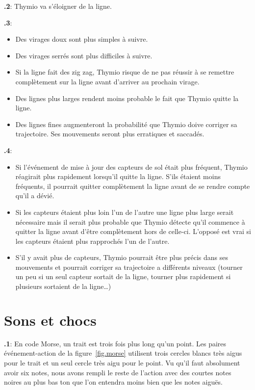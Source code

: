 \documentclass[12pt,a4paper,english]{article}
\begin{document}
\textbf{\thesection.2}: Thymio va s'éloigner de la ligne.

\textbf{\thesection.3}:
\begin{itemize}
\item Des virages doux sont plus simples à suivre. 
\item Des virages serrés sont plus difficiles à suivre.
\item Si la ligne fait des zig zag, Thymio risque de ne pas réussir à se remettre complètement sur la ligne avant d'arriver au prochain virage.
\item Des lignes plus larges rendent moins probable le fait que Thymio quitte la ligne.
\item Des lignes fines augmenteront la probabilité que Thymio doive corriger sa trajectoire. Ses mouvements seront plus erratiques et saccadés.
\end{itemize}


\textbf{\thesection.4}:
\begin{itemize}
\item Si l'événement de mise à jour des capteurs de sol était plus fréquent, Thymio réagirait plus rapidement lorsqu'il quitte la ligne. S'ils étaient moins fréquents, il pourrait quitter complètement la ligne avant de se rendre compte qu'il a dévié.
\item Si les capteurs étaient plus loin l'un de l'autre une ligne plus large serait nécessaire mais il serait plus probable que Thymio détecte qu'il commence à quitter la ligne avant d'être complètement hors de celle-ci. L'opposé est vrai si les capteurs étaient plus rapprochés l'un de l'autre.
\item S'il y avait plus de capteurs, Thymio pourrait être plus précis dans ses mouvements et pourrait corriger sa trajectoire a différents niveaux (tourner un peu si un seul capteur sortait de la ligne, tourner plus rapidement si plusieurs sortaient de la ligne\ldots)
\end{itemize}

\section{Sons et chocs}

\textbf{\thesection.1}:
En code Morse, un trait est trois fois plus long qu'un point. Les paires événement-action de la figure~\ref{fig.morse} utilisent trois cercles blancs très aigus pour le trait et un seul cercle très aigu pour le point. Vu qu'il faut absolument avoir six notes, nous avons rempli le reste de l'action avec des courtes notes noires au plus bas ton que l'on entendra moins bien que les notes aiguës.
\end{document}
